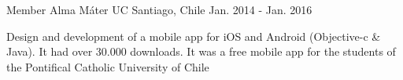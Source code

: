 

\begin{cventries}

  \cventry
    {Member}
    {Alma Máter UC}
    {Santiago, Chile}
    {Jan. 2014 - Jan. 2016}
    {
      \begin{cvitems}
        \item {Design and development of a mobile app for iOS and Android (Objective-c \& Java). It had over 30.000 downloads. It was a free mobile app for the students of the Pontifical Catholic University of Chile}
      \end{cvitems}
    }

\end{cventries}
